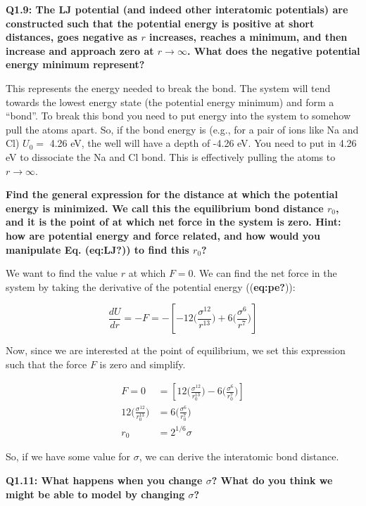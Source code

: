 \documentclass{book}
\begin{document}
\textbf{Q1.9: The LJ potential (and indeed other interatomic potentials) are
constructed such that the potential energy is positive at short distances,
goes negative as \(r\) increases, reaches a minimum, and then increase and
approach zero at \(r \rightarrow \infty\). What does the negative potential
energy minimum represent?}

This represents the energy needed to break the bond. The system will tend
towards the lowest energy state (the potential energy minimum) and form a
``bond''. To break this bond you need to put energy into the system to somehow
pull the atoms apart. So, if the bond energy is (e.g., for a pair of ions like
Na and Cl) \(U_{\text{0}} =\) 4.26 eV, the well will have a depth of -4.26 eV.
You need to put in 4.26 eV to dissociate the Na and Cl bond. This is
effectively pulling the atoms to \(r \rightarrow \infty\).

\textbf{Find the general expression for the distance at which the potential
energy is minimized. We call this the equilibrium bond distance \(r_0\), and
it is the point of at which net force in the system is zero. Hint: how are
potential energy and force related, and how would you manipulate Eq.
(\textbf{eq:LJ?})) to find this \(r_0\)?}

We want to find the value \(r\) at which \(F = 0\). We can find the net force
in the system by taking the derivative of the potential energy
((\textbf{eq:pe?})):

\begin{equation*}   \frac{dU}{dr} = -F = -\left[-12\Big(\frac{\sigma^{12}}{r^{13}}\Big)+6\Big(\frac{\sigma^6}{r^7}\Big)\right] \end{equation*}

Now, since we are interested at the point of equilibrium, we set this
expression such that the force \(F\) is zero and simplify.

\begin{align*}   F = 0 &= \left[12\Big(\frac{\sigma^{12}}{r_0^{13}}\Big)-6\Big(\frac{\sigma^6}{r_0^7}\Big)\right]\\   12\Big(\frac{\sigma^{12}}{r_0^{13}}\Big)&=6\Big(\frac{\sigma^6}{r_0^7}\Big)\\   r_0 &= 2^{1/6}\sigma \end{align*}

So, if we have some value for \(\sigma\), we can derive the interatomic bond
distance.

\textbf{Q1.11: What happens when you change \(\sigma\)? What do you think we
might be able to model by changing \(\sigma\)?}
\end{document}
